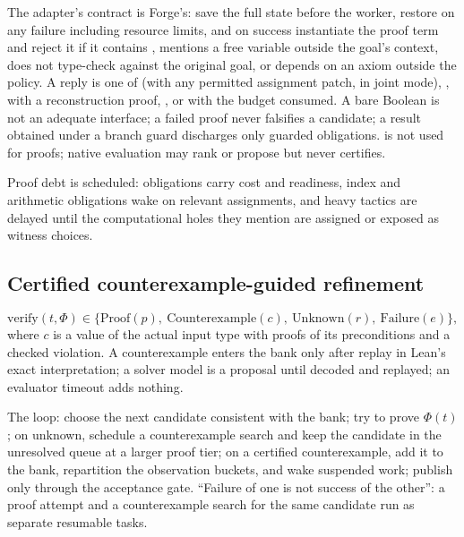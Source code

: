 The adapter's contract is Forge's: save the full state before the worker, restore on any failure including resource limits, and on success instantiate the proof term and reject it if it contains , mentions a free variable outside the goal's context, does not type-check against the original goal, or depends on an axiom outside the policy. A reply is one of  (with any permitted assignment patch, in joint mode), ,  with a reconstruction proof, , or  with the budget consumed. A bare Boolean is not an adequate interface; a failed proof never falsifies a candidate; a result obtained under a branch guard discharges only guarded obligations.  is not used for proofs; native evaluation may rank or propose but never certifies.

Proof debt is scheduled: obligations carry cost and readiness, index and arithmetic obligations wake on relevant assignments, and heavy tactics are delayed until the computational holes they mention are assigned or exposed as witness choices.

\subsection{Certified counterexample-guided refinement}\label{sec:cegis}

\begin{definition}[Verifier]
\[
\mathrm{verify}(t, \Phi) \in \{\mathrm{Proof}(p),\ \mathrm{Counterexample}(c),\ \mathrm{Unknown}(r),\ \mathrm{Failure}(e)\},
\]
where $c$ is a value of the actual input type with proofs of its preconditions and a checked violation. A counterexample enters the bank only after replay in Lean's exact interpretation; a solver model is a proposal until decoded and replayed; an evaluator timeout adds nothing.
\end{definition}

The loop: choose the next candidate consistent with the bank; try to prove $\Phi(t)$; on unknown, schedule a counterexample search and keep the candidate in the unresolved queue at a larger proof tier; on a certified counterexample, add it to the bank, repartition the observation buckets, and wake suspended work; publish only through the acceptance gate. ``Failure of one is not success of the other'': a proof attempt and a counterexample search for the same candidate run as separate resumable tasks.

